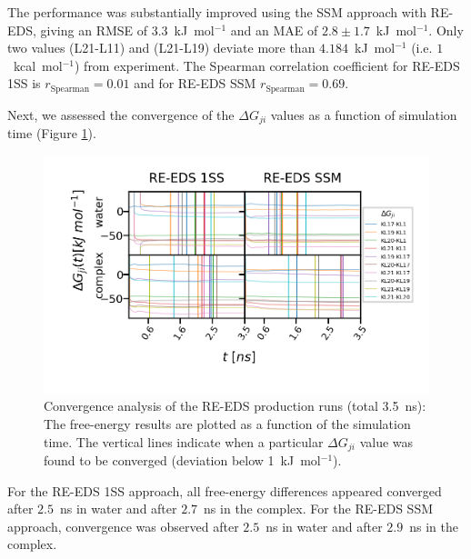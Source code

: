 The performance was substantially improved using the SSM approach with RE-EDS, giving an RMSE of $3.3$~kJ~mol$^{-1}$ and an MAE of $2.8 \pm 1.7$~kJ~mol$^{-1}$. 
Only two values (L21-L11) and (L21-L19) deviate more than $4.184$~kJ~mol$^{-1}$ (i.e. $1$~kcal~mol$^{-1}$) from experiment.
The Spearman correlation coefficient for RE-EDS 1SS is $r_{\text{Spearman}}=0.01$ and for RE-EDS SSM $r_{\text{Spearman}}=0.69$.

Next, we assessed the convergence of the $\Delta G_{ji}$ values as a function of simulation time (Figure \ref{SIfig:CHK1_RingOpening_dF_convergence}).
\begin{figure}[H]
\centering
\includegraphics[width=\textwidth]{fig/results/ringOpening/FE/dF_RingOpening_Convergence.png}
\caption{Convergence analysis of the RE-EDS production runs (total 3.5~ns): The free-energy results are plotted as a function of the simulation time. The vertical lines indicate when a particular $\Delta G_{ji}$ value was found to be converged (deviation below 1~kJ~mol$^{-1}$).}
\label{SIfig:CHK1_RingOpening_dF_convergence}
\end{figure}

For the RE-EDS 1SS approach, all free-energy differences appeared converged after $2.5$~ns in water and after $2.7$~ns in the complex. For the RE-EDS SSM approach, convergence was observed after $2.5$~ns in water and after $2.9$~ns in the complex.

